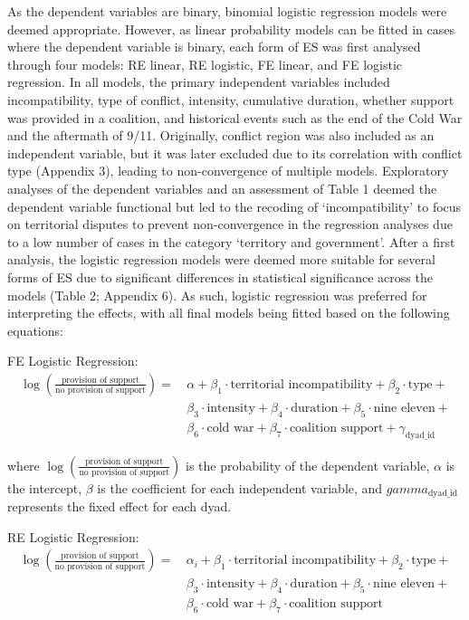\documentclass[
]{article}
\begin{document}
As the dependent variables are binary, binomial logistic regression
models were deemed appropriate. However, as linear probability models
can be fitted in cases where the dependent variable is binary, each form
of ES was first analysed through four models: RE linear, RE logistic, FE
linear, and FE logistic regression. In all models, the primary
independent variables included incompatibility, type of conflict,
intensity, cumulative duration, whether support was provided in a
coalition, and historical events such as the end of the Cold War and the
aftermath of 9/11. Originally, conflict region was also included as an
independent variable, but it was later excluded due to its correlation
with conflict type (Appendix 3), leading to non-convergence of multiple
models. Exploratory analyses of the dependent variables and an
assessment of Table 1 deemed the dependent variable functional but led
to the recoding of `incompatibility' to focus on territorial disputes to
prevent non-convergence in the regression analyses due to a low number
of cases in the category `territory and government'. After a first
analysis, the logistic regression models were deemed more suitable for
several forms of ES due to significant differences in statistical
significance across the models (Table 2; Appendix 6). As such, logistic
regression was preferred for interpreting the effects, with all final
models being fitted based on the following equations:

FE Logistic Regression: \[
\begin{aligned}
\log \left( \frac{\text{provision of support}}{\text{no provision of support}} \right) =\,
&\alpha + 
\beta_1 \cdot \text{territorial incompatibility} + 
\beta_2 \cdot \text{type} + \\
&\beta_3 \cdot \text{intensity} + 
 \beta_4 \cdot \text{duration} + 
\beta_5 \cdot \text{nine eleven} + \\
&\beta_6 \cdot \text{cold war} + 
\beta_7 \cdot \text{coalition support} + 
\gamma_{\text{dyad\_id}}
\end{aligned}
\]

where
\(\log \left( \frac{\text{provision of support}}{\text{no provision of support}} \right)\)
is the probability of the dependent variable, \(\alpha\) is the
intercept, \(\beta\) is the coefficient for each independent variable,
and \(gamma_{\text{dyad\_id}}\) represents the fixed effect for each
dyad.

RE Logistic Regression: \[
\begin{aligned}
\log \left( \frac{\text{provision of support}}{\text{no provision of support}} \right) =\,
&\alpha_i + 
\beta_1 \cdot \text{territorial incompatibility} + 
\beta_2 \cdot \text{type} + \\
&\beta_3 \cdot \text{intensity} + 
\beta_4 \cdot \text{duration} + 
\beta_5 \cdot \text{nine eleven} + \\
&\beta_6 \cdot \text{cold war} + 
\beta_7 \cdot \text{coalition support}
\end{aligned}
\]
\end{document}
